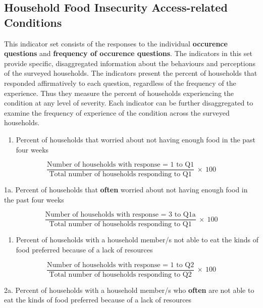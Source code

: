\documentclass[12pt,]{book}
\providecommand{\tightlist}{%
  \setlength{\itemsep}{0pt}\setlength{\parskip}{0pt}}
\theoremstyle{definition}
\theoremstyle{definition}
\theoremstyle{definition}
\theoremstyle{remark}
\begin{document}
\hypertarget{household-food-insecurity-access-related-conditions}{%
\subsection{Household Food Insecurity Access-related
Conditions}\label{household-food-insecurity-access-related-conditions}}

This indicator set consists of the responses to the individual
\textbf{occurence questions} and \textbf{frequency of occurence
questions}. The indicators in this set provide specific, disaggregated
information about the behaviours and perceptions of the surveyed
households. The indicators present the percent of households that
responded affirmatively to each question, regardless of the frequency of
the experience. Thus they measure the percent of households experiencing
the condition at any level of severity. Each indicator can be further
disaggregated to examine the frequency of experience of the condition
across the surveyed households.

\begin{enumerate}
\def\labelenumi{\arabic{enumi}.}
\tightlist
\item
  Percent of households that worried about not having enough food in the
  past four weeks
\end{enumerate}

\[ \frac{\text{Number of households with response = 1 to Q1}}{\text{Total number of households responding to Q1}} ~ \times ~ 100 \]

1a. Percent of households that \textbf{often} worried about not having
enough food in the past four weeks

\[ \frac{\text{Number of households with response = 3 to Q1a}}{\text{Total number of households responding to Q1}} ~ \times ~ 100 \]

\begin{enumerate}
\def\labelenumi{\arabic{enumi}.}
\setcounter{enumi}{1}
\tightlist
\item
  Percent of households with a household member/s not able to eat the
  kinds of food preferred because of a lack of resources
\end{enumerate}

\[ \frac{\text{Number of households with response = 1 to Q2}}{\text{Total number of households responding to Q2}} ~ \times ~ 100 \]

2a. Percent of households with a household member/s who \textbf{often}
are not able to eat the kinds of food preferred because of a lack of
resources
\end{document}
